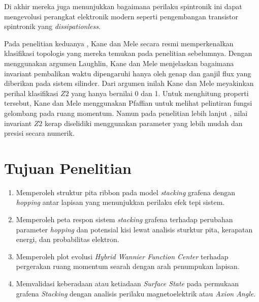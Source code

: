 Di akhir mereka juga menunjukkan bagaimana perilaku spintronik ini dapat mengevolusi perangkat elektronik modern seperti pengembangan transistor spintronik yang \textit{dissipationless}.
\par 
Pada penelitian keduanya \parencite{PhysRevLett.95.146802}, Kane dan Mele secara resmi memperkenalkan klasifikasi topologis yang mereka temukan pada penelitian sebelumnya. Dengan menggunakan argumen Laughlin, Kane dan Mele menjelaskan bagaimana invariant pembalikan waktu dipengaruhi hanya oleh genap dan ganjil flux yang diberikan pada sistem silinder. Dari argumen inilah Kane dan Mele meyakinkan perihal klasifikasi $Z2$ yang hanya bernilai 0 dan 1. Untuk menghitung properti tersebut, Kane dan Mele menggunakan Pfaffian untuk melihat pelintiran fungsi gelombang pada ruang momentum. Namun pada penelitian lebih lanjut \parencite{Vanderbilt2018} \parencite{PhysRevB.75.121403} \parencite{PhysRevB.83.035108}, nilai invariant $Z2$ kerap diselidiki menggunakan parameter yang lebih mudah dan presisi secara numerik.

\section{Tujuan Penelitian}
\begin{enumerate}
  \item  Memperoleh struktur pita ribbon pada model  \textit{stacking} grafena dengan \textit{hopping} antar lapisan yang menunjukkan perilaku efek tepi sistem.
  \item Memperoleh peta respon sistem  \textit{stacking} grafena terhadap perubahan parameter \textit{hopping} dan potensial kisi lewat analisis sturktur pita, kerapatan energi, dan probabilitas elektron.
  \item Memperoleh plot evolusi  \textit{ Hybrid Wannier Function Center} terhadap pergerakan ruang momentum searah dengan arah penumpukan lapisan.
  \item Memvalidasi keberadaan atau ketiadaan \textit{Surface State} pada permukaan grafena \textit{Stacking} dengan analisis perilaku magnetoelektrik atau \textit{Axion Angle}.
\end{enumerate}
